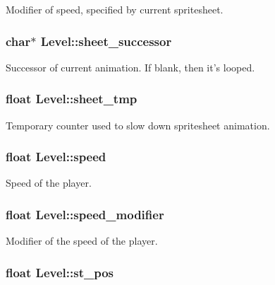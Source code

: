 Modifier of speed, specified by current spritesheet. \hypertarget{structLevel_adfecc93d9f14b4725534aa36f5a79c64}{
\subsubsection[{sheet\-\_\-successor}]{\setlength{\rightskip}{0pt plus 5cm}char$\ast$ Level\-::sheet\-\_\-successor}}\label{structLevel_adfecc93d9f14b4725534aa36f5a79c64}
Successor of current animation. If blank, then it's looped. \hypertarget{structLevel_a22e80ea91fd267dae85c0457e581d072}{
\subsubsection[{sheet\-\_\-tmp}]{\setlength{\rightskip}{0pt plus 5cm}float Level\-::sheet\-\_\-tmp}}\label{structLevel_a22e80ea91fd267dae85c0457e581d072}
Temporary counter used to slow down spritesheet animation. \hypertarget{structLevel_a936a1d131d1e056878474ca831c5e88f}{
\subsubsection[{speed}]{\setlength{\rightskip}{0pt plus 5cm}float Level\-::speed}}\label{structLevel_a936a1d131d1e056878474ca831c5e88f}
Speed of the player. \hypertarget{structLevel_a0f6fa70a2e0b85437dc1973d1409381f}{
\subsubsection[{speed\-\_\-modifier}]{\setlength{\rightskip}{0pt plus 5cm}float Level\-::speed\-\_\-modifier}}\label{structLevel_a0f6fa70a2e0b85437dc1973d1409381f}
Modifier of the speed of the player. \hypertarget{structLevel_ab13f799d9e2e06a04debbd97676fb512}{
\subsubsection[{st\-\_\-pos}]{\setlength{\rightskip}{0pt plus 5cm}float Level\-::st\-\_\-pos}}\label{structLevel_ab13f799d9e2e06a04debbd97676fb512}
